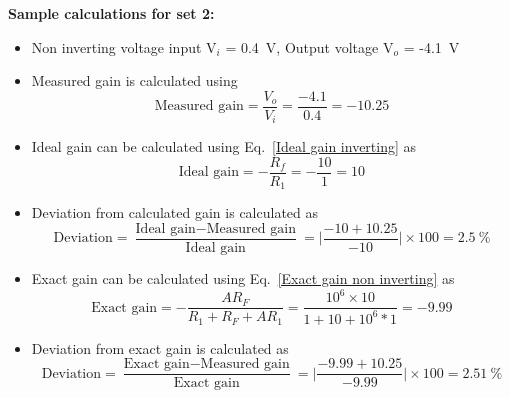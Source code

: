 \documentclass[11pt]{scrreprt}
\begin{document}
\noindent\textbf{Sample calculations for set 2:}\\
\begin{itemize}
    \item Non inverting voltage input V$_i$ = 0.4~V, Output voltage V$_o$ = -4.1~V
    \item Measured gain is calculated using 
    \begin{equation}
        \text{Measured gain} = \frac{V_o}{V_i} = \frac{-4.1}{0.4} = -10.25
    \end{equation}
    \item Ideal gain can be calculated using Eq.~\ref{Ideal gain inverting} as
    \begin{equation}
        \text{Ideal gain} = -\frac{R_f}{R_1} = -\frac{10}{1} = 10
    \end{equation}
    \item Deviation from calculated gain is calculated as
    \begin{equation}
        \text{Deviation} = \frac{\text{Ideal gain} - \text{Measured gain}}{\text{Ideal gain}} = \bigg\lvert\frac{-10+10.25}{-10}\bigg\rvert\times100 = 2.5~\% 
    \end{equation}
    \item Exact gain can be calculated using Eq.~\ref{Exact gain non inverting} as
    \begin{equation}
        \text{Exact gain} = - \frac{A R_F}{R_1 + R_F + A R_1} = \frac{10^6\times10}{1+10+10^6*1} = -9.99
    \end{equation}
    \item Deviation from exact gain is calculated as 
    \begin{equation}
        \text{Deviation} = \frac{\text{Exact gain} - \text{Measured gain}}{\text{Exact gain}} = \bigg\lvert\frac{-9.99+10.25}{-9.99}\bigg\rvert\times100 = 2.51~\%
    \end{equation}
\end{itemize}
\end{document}
